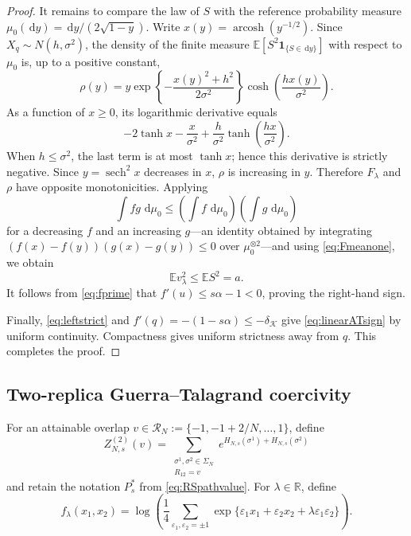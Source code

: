 \documentclass[11pt]{article}
\numberwithin{equation}{section}
\theoremstyle{plain}
\theoremstyle{definition}
\newcommand{\E}{\mathbb E}
\newcommand{\1}{\mathbf 1}
\newcommand{\sech}{\operatorname{sech}}
\newcommand{\cK}{\mathcal K}
\newcommand{\dd}{\,\mathrm d}
\begin{document}
\begin{proof}
It remains to compare the law of $S$ with the reference probability
measure $\mu_0(\dd y)=\dd y/(2\sqrt{1-y})$.  Write
$x(y)=\operatorname{arcosh}(y^{-1/2})$.  Since
$X_q\sim N(h,\sigma^2)$, the density of the finite measure
$\E[S^2\1_{\{S\in\dd y\}}]$ with respect to $\mu_0$ is, up to a
positive constant,
\begin{equation}
 \rho(y)=y\exp\left\{-\frac{x(y)^2+h^2}{2\sigma^2}\right\}
 \cosh\left(\frac{h x(y)}{\sigma^2}\right).
 \label{eq:rhodensity}
\end{equation}
As a function of $x\ge0$, its logarithmic derivative equals
\[
 -2\tanh x-\frac{x}{\sigma^2}
 +\frac{h}{\sigma^2}\tanh\left(\frac{hx}{\sigma^2}\right).
\]
When $h\le\sigma^2$, the last term is at most $\tanh x$; hence this
derivative is strictly negative.  Since $y=\sech^2x$ decreases in
$x$, $\rho$ is increasing in $y$.  Therefore $F_\lambda$ and $\rho$
have opposite monotonicities.  Applying
\[
 \int fg\,\dd\mu_0\le\left(\int f\,\dd\mu_0\right)
 \left(\int g\,\dd\mu_0\right)
\]
for a decreasing $f$ and an increasing $g$---an identity obtained by
integrating $(f(x)-f(y))(g(x)-g(y))\le0$ over $\mu_0^{\otimes2}$---and
using \eqref{eq:Fmeanone}, we obtain
\begin{equation}
 \E v_\lambda^2\le\E S^2=a.
 \label{eq:strictATdiffusion}
\end{equation}
It follows from \eqref{eq:fprime} that
$f'(u)\le s\alpha-1<0$, proving the right-hand sign.

Finally, \eqref{eq:leftstrict} and
$f'(q)=-(1-s\alpha)\le-\delta_{\cK}$ give
\eqref{eq:linearATsign} by uniform continuity.  Compactness gives
uniform strictness away from $q$.  This completes the proof.
\end{proof}

\subsection{Two-replica Guerra--Talagrand coercivity}\label{subsec:GT}

For an attainable overlap $v\in\mathcal R_N
:=\{-1,-1+2/N,\ldots,1\}$, define
\begin{equation}
 Z^{(2)}_{N,s}(v)
 =
 \sum_{\substack{\sigma^1,\sigma^2\in\Sigma_N\\R_{12}=v}}
 e^{H_{N,s}(\sigma^1)+H_{N,s}(\sigma^2)}
 \label{eq:constrainedZ}
\end{equation}
and retain the notation $P_s^*$ from \eqref{eq:RSpathvalue}.  For
$\lambda\in\mathbb R$, define
\begin{equation}
 f_\lambda(x_1,x_2)
 =\log\left(\frac14\sum_{\varepsilon_1,\varepsilon_2=\pm1}
 \exp\{\varepsilon_1x_1+\varepsilon_2x_2
       +\lambda\varepsilon_1\varepsilon_2\}\right).
 \label{eq:GTterminal}
\end{equation}
\end{document}
